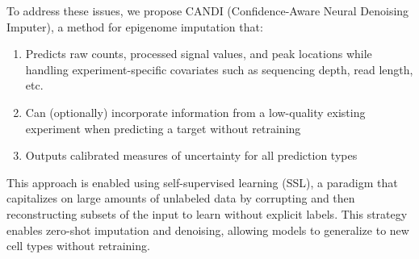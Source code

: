 To address these issues, we propose CANDI (Confidence-Aware Neural Denoising Imputer), a method for epigenome imputation that:
\begin{enumerate}
    \item Predicts raw counts, processed signal values, and peak locations while handling experiment-specific covariates such as sequencing depth, read length, etc.
    \item Can (optionally) incorporate information from a low-quality existing experiment when predicting a target without retraining
    \item Outputs calibrated measures of uncertainty for all prediction types
\end{enumerate}

This approach is enabled using self-supervised learning (SSL), a paradigm that capitalizes on large amounts of unlabeled data by corrupting and then reconstructing subsets of the input to learn without explicit labels. This strategy enables zero-shot imputation and denoising, allowing models to generalize to new cell types without retraining.

